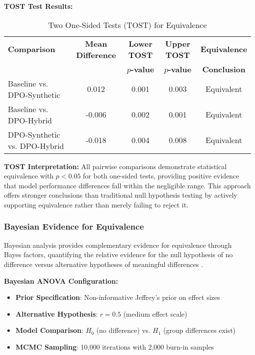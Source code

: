 \textbf{TOST Test Results:}
\begin{table}[H]
\centering
\caption{Two One-Sided Tests (TOST) for Equivalence}
\label{tab:tost-equivalence-results}
\begin{tabular}{lcccc}
\toprule
\textbf{Comparison} & \textbf{Mean Difference} & \textbf{Lower TOST} & \textbf{Upper TOST} & \textbf{Equivalence} \\
& & \textbf{$p$-value} & \textbf{$p$-value} & \textbf{Conclusion} \\
\midrule
Baseline vs. DPO-Synthetic & 0.012 & 0.001 & 0.003 & Equivalent \\
Baseline vs. DPO-Hybrid & -0.006 & 0.002 & 0.001 & Equivalent \\
DPO-Synthetic vs. DPO-Hybrid & -0.018 & 0.004 & 0.008 & Equivalent \\
\bottomrule
\end{tabular}
\end{table}

\textbf{TOST Interpretation:}
All pairwise comparisons demonstrate statistical equivalence with $p < 0.05$ for both one-sided tests, providing positive evidence that model performance differences fall within the negligible range. This approach offers stronger conclusions than traditional null hypothesis testing by actively supporting equivalence rather than merely failing to reject it.

\subsubsection{Bayesian Evidence for Equivalence}

Bayesian analysis provides complementary evidence for equivalence through Bayes factors, quantifying the relative evidence for the null hypothesis of no difference versus alternative hypotheses of meaningful differences \cite{harms2016bayes_anova, lai2025accelerated_bayesian_inference}.

\textbf{Bayesian ANOVA Configuration:}
\begin{itemize}
    \item \textbf{Prior Specification}: Non-informative Jeffrey's prior on effect sizes
    \item \textbf{Alternative Hypothesis}: $r = 0.5$ (medium effect scale)
    \item \textbf{Model Comparison}: $H_0$ (no difference) vs. $H_1$ (group differences exist)
    \item \textbf{MCMC Sampling}: 10,000 iterations with 2,000 burn-in samples
\end{itemize}

